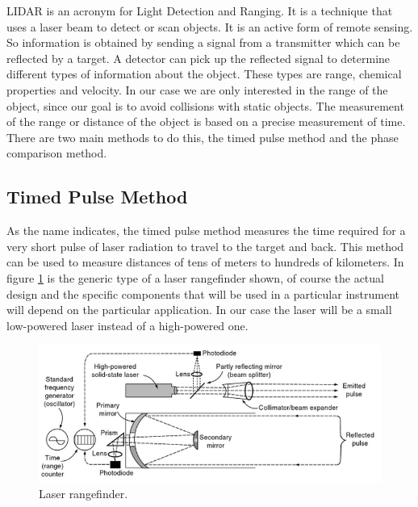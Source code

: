 \documentclass{article}
\begin{document}
LIDAR is an acronym for Light Detection and Ranging. It is a technique that uses a laser beam to detect or scan objects. It is an active form of remote sensing. So information is obtained by sending a signal from a transmitter which can be reflected by a target. A detector can pick up the reflected signal to determine different types of information about the object. These types are range, chemical properties and velocity.
In our case we are only interested in the range of the object, since our goal is to avoid collisions with static objects. The measurement of the range or distance of the object is based on a precise measurement of time. There are two main methods to do this, the timed pulse method and the phase comparison method.


\subsection{Timed Pulse Method}

As the name indicates, the timed pulse method measures the time required for a very short pulse of laser radiation to travel to the target and back. This method can be used to measure distances of tens of meters to hundreds of kilometers. In figure \ref{lidar1} is the generic type of a laser rangefinder shown, of course the actual design and the specific components that will be used in a particular instrument will depend on the particular application. In our case the laser will be a small low-powered laser instead of a high-powered one.

\begin{figure}[H]
	\centering
	\includegraphics[scale=0.8]{figures/TimedPulse}
	\caption{Laser rangefinder. }
	\label{lidar1}
\end{figure}
\end{document}

